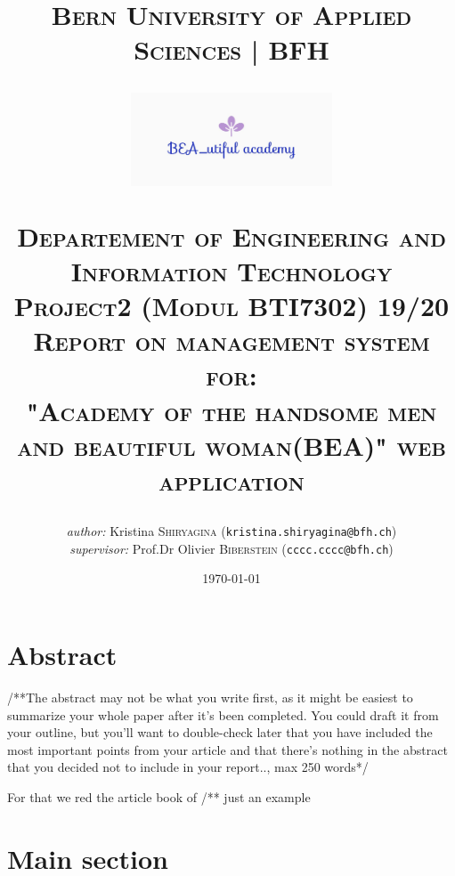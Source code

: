 \documentclass{scrartcl}
\begin{document}
\begin{titlepage}


\title{\textsc{\LARGE Bern University of Applied Sciences | BFH }\\[1cm]
\begin{center}
\includegraphics[width = 60mm]{bea_logo.JPG}
\end{center}
\textsc{\small Departement of Engineering and Information Technology}\\
\textsc{\small Project2 (Modul BTI7302) 19/20}\\[1cm]
\textsc{\small Report on management system for: }\\
\textsc{"Academy of the handsome men and beautiful woman(BEA)" web application}}
\date{\today}   %
\author{\textit{author: }Kristina \textsc{Shiryagina} (\texttt{kristina.shiryagina@bfh.ch}) \\
 \textit{supervisor: } Prof.Dr Olivier  \textsc{Biberstein}  (\texttt{cccc.cccc@bfh.ch})\\
 }
\maketitle	
	
\tableofcontents
\clearpage
\end{titlepage}


\section{Abstract}
/**The abstract may not be what you write first, as it might be easiest to summarize your whole paper after it's been completed. You could draft it from your outline, but you'll want to double-check later that you have included the most important points from your article and that there's nothing in the abstract that you decided not to include in your report.., max 250 words*/
\lipsum[1-3]


 For that we red the article book of 
\cite{Diniz:2010:UG0:525452.452352}                 /** just an example



\section{Main section}
\end{document}
